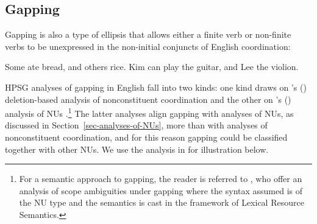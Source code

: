 \documentclass[output=paper
                ,modfonts
                ,nonflat
	        ,collection
	        ,collectionchapter
	        ,collectiontoclongg
 	        ,biblatex
                ,babelshorthands
                ,newtxmath
                ,draftmode
                ,colorlinks, citecolor=brown
]{./langsci/langscibook}
\begin{document}
\iffalse{ To illustrate, an English verb form mismatch is depicted in (\ref{verbform}), from \citep[see][5]{Shiraishi2019}, where the left conjunct requires a participle while the shared material contains an infinitive form of the verb \textit{appear}.

\ea Some new hybrid models already have, and others soon will appear in the automobile industry.\label{verbform}

\citep{Shiraishi2019} capture verb form mismatch of this kind by introducing into their analysis of RNR the feature LID, which carries lexeme identity information. That is, this feature ensures semantic and syntactic category identity but ignores differences introduced by inflectional suffixes, with the result that the participle and the infinitive in (\ref{verbform}) count as lexeme-identical. RNR is licensed by (\ref{rnrcx}), where the LID feature is included in the MP feature also used in \citet{Chaves2014} (see (\ref{63})).


Shiraishi2019 rnr-cx here \label{rnrcx}


(\ref{rnrcx}) ensures that the content of the $l_{2}$ list in the left conjunct, which is elided and hence not represented in the mother, is shared with the $r_{2}$ list in the right conjunct via the LID feature. The lists $l_{1}$, $r_{1}$ and $r_{3}$ in (\ref{rnrcx}) represent material present overtly in the left and right conjuncts.
}\fi


\subsection{Gapping}

Gapping is also a type of ellipsis that allows either a finite verb or non-finite
verbs to be unexpressed in the non-initial conjuncts of English coordination:

\ea Some ate bread, and others rice.\z
\ea Kim can play the guitar, and Lee the violion.\z
%
%
%
%

HPSG analyses of gapping in English fall into two kinds: one kind draws on \citeauthor{Beavers2004}'s (\citeyear{Beavers2004}) deletion-based analysis of nonconstituent coordination \citep{Chaves2009} and the other on \citeauthor{Ginzburg:Sag:2000}'s (\citeyear{Ginzburg:Sag:2000}) analysis of NUs \citep{Abeille2014}.\footnote{For a semantic approach to gapping, the reader is referred to \citet{Park2018}, who offer an analysis of scope ambiguities under gapping where the syntax assumed is of the NU type and the semantics is cast in the framework of Lexical Resource Semantics.} The latter analyses align gapping with analyses of NUs, as discussed in Section~\ref{sec-analyses-of-NUs}, more than with analyses of nonconstituent coordination, and for this reason gapping could be classified together with other NUs. We use the analysis in \citet{Abeille2014} for illustration below.
\end{document}
